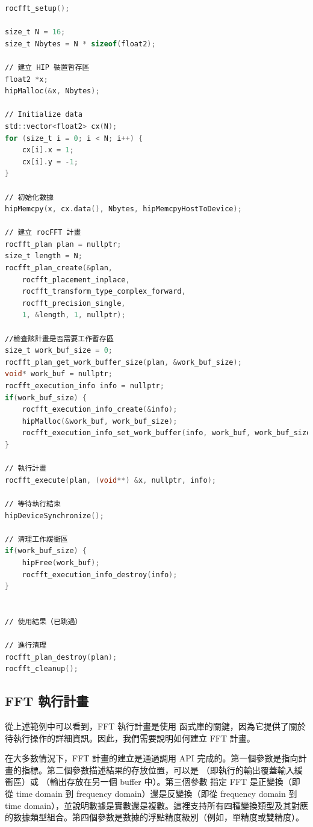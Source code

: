 \begin{lstlisting}[language=C, caption={使用 \term{rocFFT} 函式庫的範例。}, captionpos=t, label={lst:rocFFT}]
rocfft_setup();

size_t N = 16;
size_t Nbytes = N * sizeof(float2);

∕∕ 建立 HIP 裝置暫存區
float2 *x;
hipMalloc(&x, Nbytes);

∕∕ Initialize data
std::vector<float2> cx(N);
for (size_t i = 0; i < N; i++) {
    cx[i].x = 1;
    cx[i].y = -1;
}

∕∕ 初始化數據
hipMemcpy(x, cx.data(), Nbytes, hipMemcpyHostToDevice);

∕∕ 建立 rocFFT 計畫
rocfft_plan plan = nullptr;
size_t length = N;
rocfft_plan_create(&plan,
    rocfft_placement_inplace,
    rocfft_transform_type_complex_forward,
    rocfft_precision_single,
    1, &length, 1, nullptr);

∕∕檢查該計畫是否需要工作暫存區
size_t work_buf_size = 0;
rocfft_plan_get_work_buffer_size(plan, &work_buf_size);
void* work_buf = nullptr;
rocfft_execution_info info = nullptr;
if(work_buf_size) {
    rocfft_execution_info_create(&info);
    hipMalloc(&work_buf, work_buf_size);
    rocfft_execution_info_set_work_buffer(info, work_buf, work_buf_size);
}

∕∕ 執行計畫
rocfft_execute(plan, (void**) &x, nullptr, info);

∕∕ 等待執行結束
hipDeviceSynchronize();

∕∕ 清理工作緩衝區
if(work_buf_size) {
    hipFree(work_buf);
    rocfft_execution_info_destroy(info);
}


∕∕ 使用結果（已跳過）

∕∕ 進行清理
rocfft_plan_destroy(plan);
rocfft_cleanup();
\end{lstlisting}

\subsection{FFT 執行計畫}
從上述範例中可以看到，FFT 執行計畫是使用  函式庫的關鍵，因為它提供了關於待執行操作的詳細資訊。因此，我們需要說明如何建立 FFT 計畫。

在大多數情況下，FFT 計畫的建立是通過調用  API 完成的。第一個參數是指向計畫的指標。第二個參數描述結果的存放位置，可以是 （即執行的輸出覆蓋輸入緩衝區）或 （輸出存放在另一個 buffer 中）。第三個參數  指定 FFT 是正變換（即從 time domain 到 frequency domain）還是反變換（即從 frequency domain  到 time domain），並說明數據是實數還是複數。這裡支持所有四種變換類型及其對應的數據類型組合。第四個參數是數據的浮點精度級別（例如，單精度或雙精度）。


